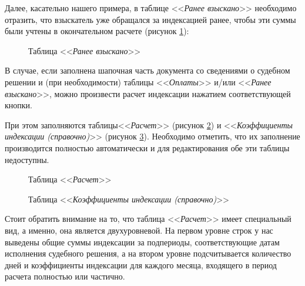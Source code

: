\documentclass[a4paper,12pt,draft]{article}
\begin{document}
Далее, касательно нашего примера, в таблице <<{\it Ранее взыскано}>> необходимо отразить, что взыскатель уже обращался за индексацией ранее, чтобы эти суммы были учтены в окончательном расчете (рисунок \ref{ris:ind3}):

\begin{figure}[h]
\caption{Таблица <<{\it Ранее взыскано}>>}
\label{ris:ind3}
\end{figure}

В случае, если заполнена шапочная часть документа со сведениями о судебном решении и (при необходимости) таблицы <<{\it Оплаты}>> и/или <<{\it Ранее взыскано}>>, можно произвести расчет индексации нажатием соответствующей кнопки.

При этом заполняются таблицы<<{\it Расчет}>> (рисунок \ref{ris:ind4}) и <<{\it Коэффициенты индексации (справочно)}>> (рисунок \ref{ris:ind5}). Необходимо отметить, что их заполнение производится полностью автоматически и для редактирования обе эти таблицы недоступны.

\begin{figure}[h]
\caption{Таблица <<{\it Расчет}>>}
\label{ris:ind4}
\end{figure}
\begin{figure}[h]
\caption{Таблица <<{\it Коэффициенты индексации (справочно)}>>}
\label{ris:ind5}
\end{figure}

Стоит обратить внимание на то, что таблица <<{\it Расчет}>> имеет специальный вид, а именно, она является двухуровневой. На первом уровне строк у нас выведены общие суммы индексации за подпериоды, соответствующие датам исполнения судебного решения, а на втором уровне подсчитывается количество дней и коэффициенты индексации для каждого месяца, входящего в период расчета полностью или частично. 
\end{document}
